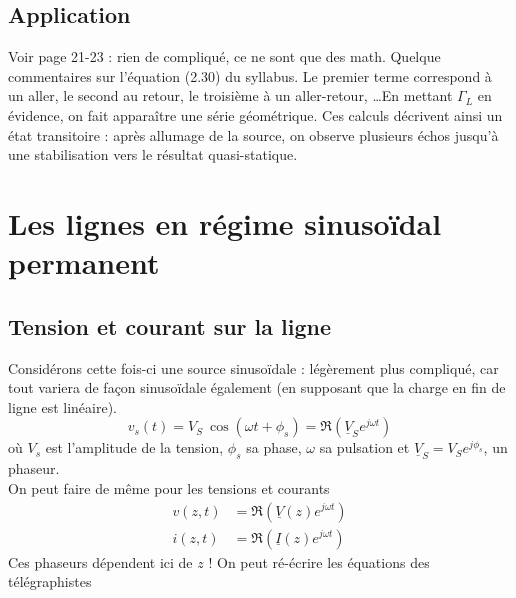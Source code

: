 	\subsection{Application}
	Voir page 21-23 : rien de compliqué, ce ne sont que des math. Quelque commentaires sur 
	l'équation (2.30) du syllabus. Le premier terme correspond à un aller, le second au 
	retour, le troisième à un aller-retour, \dots En mettant $\Gamma_L$ en évidence, on fait 
	apparaître une série géométrique. Ces calculs décrivent ainsi un état transitoire : après 
	allumage de la source, on observe plusieurs échos jusqu'à une stabilisation vers le 
	résultat quasi-statique.
	
\section{Les lignes en régime sinusoïdal permanent}
	\subsection{Tension et courant sur la ligne}
	\label{sec:2.5.1}
	Considérons cette fois-ci une source sinusoïdale : légèrement plus compliqué, car tout 
	variera de façon sinusoïdale également (en supposant que la charge en fin de ligne est 
	linéaire).
	\begin{equation}
	v_s(t) = V_S\ \cos(\omega t + \phi_s) = \Re\left(\underline{V}_Se^{j\omega t}\right)
	\end{equation}
	où $V_s$ est l’amplitude de la tension, $\phi_s$ sa phase, $\omega$ sa pulsation et 
	$\underline{V}_S = V_Se^{j\phi_s}$, un phaseur.\\
	On peut faire de même pour les tensions et courants
	\begin{equation}
	\begin{split}
	v(z,t) &= \Re \left(\underline{V}(z)e^{j\omega t}\right)\\
	i(z,t) &= \Re \left(\underline{I}(z)e^{j\omega t}\right)	
	\end{split}
	\end{equation}
	\danger Ces phaseurs dépendent ici de $z$ ! On peut ré-écrire les équations des 
	télégraphistes\\
	\ \\
	
